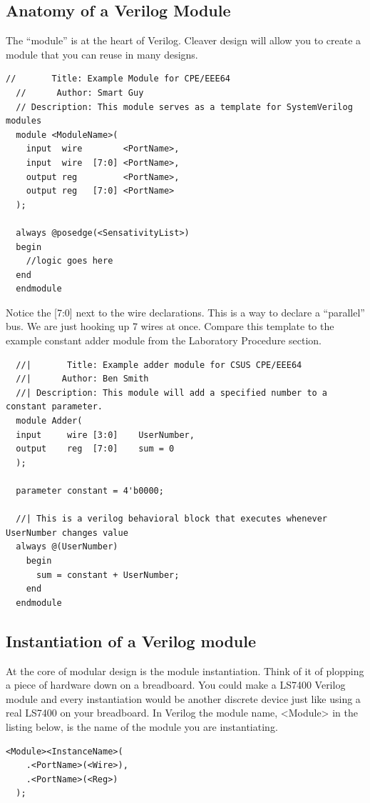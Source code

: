     \subsection{Anatomy of a Verilog Module}
      The ``module'' is at the heart of Verilog. Cleaver design will allow you to create a module that you can reuse in many designs.
      \begin{lstlisting}[caption={Example Module}]
  //       Title: Example Module for CPE/EEE64
  //      Author: Smart Guy
  // Description: This module serves as a template for SystemVerilog modules
  module <ModuleName>(
    input  wire        <PortName>,
    input  wire  [7:0] <PortName>,
    output reg         <PortName>,
    output reg   [7:0] <PortName>
  );

  always @posedge(<SensativityList>)
  begin
    //logic goes here
  end
  endmodule
      \end{lstlisting}
      Notice the [7:0] next to the wire declarations. This is a way to declare a ``parallel'' bus. We are just hooking up 7 wires at once. Compare this template to the example constant adder module from the Laboratory Procedure section.
  \begin{lstlisting}
  //|       Title: Example adder module for CSUS CPE/EEE64
  //|      Author: Ben Smith
  //| Description: This module will add a specified number to a constant parameter.
  module Adder(
  input     wire [3:0]    UserNumber,
  output    reg  [7:0]    sum = 0
  );

  parameter constant = 4'b0000;

  //| This is a verilog behavioral block that executes whenever UserNumber changes value
  always @(UserNumber)
    begin
      sum = constant + UserNumber;
    end
  endmodule
  \end{lstlisting}

    \subsection{Instantiation of a Verilog module}
      At the core of modular design is the module instantiation. Think of it of plopping a piece of hardware down on a breadboard. You could make a LS7400 Verilog module and every instantiation would be another discrete device just like using a real LS7400 on your breadboard. In Verilog the module name, <Module> in the listing below, is the name of the module you are instantiating.
    \begin{lstlisting}[caption={Module instantiation template}]
  <Module><InstanceName>(
    .<PortName>(<Wire>),
    .<PortName>(<Reg>)
  );
    \end{lstlisting}
    
